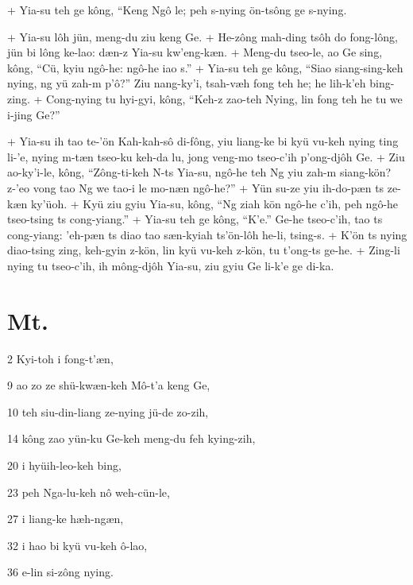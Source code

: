 +	Yia-su teh ge kông, ``Keng Ngô le; peh s-nying ön-tsông ge s-nying.
\par
+	Yia-su lôh jün, meng-du ziu keng Ge.
+	He-zông mah-ding tsôh do fong-lông, jün bi lông ke-lao: dæn-z Yia-su kw'eng-kæn.
+	Meng-du tseo-le, ao Ge sing, kông, ``Cü, kyiu ngô-he: ngô-he iao s.''
+	Yia-su teh ge kông, ``Siao siang-sing-keh nying, ng yü zah-m p'ô?'' Ziu nang-ky'i, tsah-væh fong teh he; he lih-k'eh bing-zing.
+	Cong-nying tu hyi-gyi, kông, ``Keh-z zao-teh Nying, lin fong teh he tu we i-jing Ge?''
\par
+	Yia-su ih tao te-'ön Kah-kah-sô di-fông, yiu liang-ke bi kyü vu-keh nying ting li-'e, nying m-tæn tseo-ku keh-da lu, jong veng-mo tseo-c'ih p'ong-djôh Ge.
+	Ziu ao-ky'i-le, kông, ``Zông-ti-keh N-ts Yia-su, ngô-he teh Ng yiu zah-m siang-kön? z-'eo vong tao Ng we tao-i le mo-næn ngô-he?''
+	Yün su-ze yiu ih-do-pæn ts ze-kæn ky'üoh.
+	Kyü ziu gyiu Yia-su, kông, ``Ng ziah kön ngô-he c'ih, peh ngô-he tseo-tsing ts cong-yiang.''
+	Yia-su teh ge kông, ``K'e.'' Ge-he tseo-c'ih, tao ts cong-yiang: 'eh-pæn ts diao tao sæn-kyiah ts'ön-lôh he-li, tsing-s.
+	K'ön ts nying diao-tsing zing, keh-gyin z-kön, lin kyü vu-keh z-kön, tu t'ong-ts ge-he.
+	Zing-li nying tu tseo-c'ih, ih mông-djôh Yia-su, ziu gyiu Ge li-k'e ge di-ka.



\section{Mt.}%

\begin{sAbstract}
	\item[2] Kyi-toh i fong-t'æn,
	\item[9] ao zo ze shü-kwæn-keh Mô-t'a keng Ge,
	\item[10] teh siu-din-liang ze-nying jü-de zo-zih,
	\item[14] kông zao yün-ku Ge-keh meng-du feh kying-zih,
	\item[20] i hyüih-leo-keh bing,
	\item[23] peh Nga-lu-keh nô weh-cün-le,
	\item[27] i liang-ke hæh-ngæn,
	\item[32] i hao bi kyü vu-keh ô-lao,
	\item[36] e-lin si-zông nying.
\end{sAbstract}

